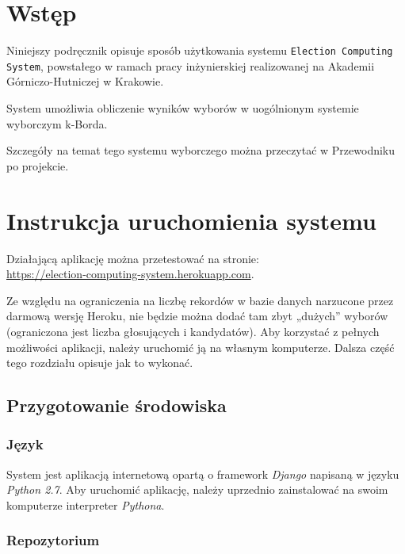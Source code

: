 \documentclass[pdflatex,11pt]{../aghdoc_version2}
\author{Tomasz Kasprzyk, Daniel Ogiela, Jakub Stępak}
\date{2016}
\begin{document}
\titlepages

\tableofcontents

\chapter{Wstęp}
\label{cha:wstep}

Niniejszy podręcznik opisuje sposób użytkowania systemu \texttt{Election Computing System}, powstałego w ramach pracy inżynierskiej realizowanej na Akademii Górniczo-Hutniczej w Krakowie.

System umożliwia obliczenie wyników wyborów w uogólnionym systemie wyborczym k-Borda.

Szczegóły na temat tego systemu wyborczego można przeczytać w Przewodniku po projekcie.


\chapter{Instrukcja uruchomienia systemu}
\label{cha:uruchomienie}

Działającą aplikację można przetestować na stronie: \\ \url{https://election-computing-system.herokuapp.com}. 

Ze względu na ograniczenia na liczbę rekordów w bazie danych narzucone przez darmową wersję Heroku, nie będzie można dodać tam zbyt „dużych” wyborów (ograniczona jest liczba głosujących i kandydatów). Aby korzystać z pełnych możliwości aplikacji, należy uruchomić ją na własnym komputerze. Dalsza część tego rozdziału opisuje jak to wykonać.

\section{Przygotowanie środowiska}
\label{sec:srodowisko}

\subsection{Język}
\label{subsec:jezyk}

System jest aplikacją internetową opartą o framework \textit{Django }napisaną w języku \textit{Python 2.7}.
Aby uruchomić aplikację, należy uprzednio zainstalować na swoim komputerze interpreter \textit{Pythona}.

\subsection{Repozytorium}
\label{subsec:repo}
\end{document}
